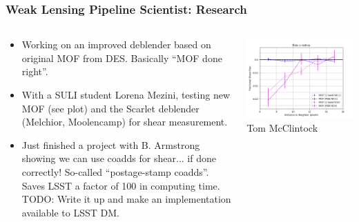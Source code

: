 \documentclass[aspectratio=169]{beamer}
\begin{document}
\frame
{

    \frametitle{Weak Lensing Pipeline Scientist: Research}


    \begin{columns}
        \begin{column}{0.5\textwidth}

            \begin{itemize}

                \item Working on an improved deblender based on original
                    MOF from DES.  Basically ``MOF done right''.

                \item With a SULI student Lorena Mezini, testing new MOF
                    (see plot) and the Scarlet deblender (Melchior, Moolencamp)
                    for shear measurement.

                \item Just finished a project with B. Armstrong showing we can use coadds
                    for shear... if done correctly!  So-called ``postage-stamp
                    coadds''.  Saves LSST a factor of 100 in computing
                    time. TODO: Write it up and make an implementation
                    available to LSST DM.

            \end{itemize}
        \end{column}
        \begin{column}{0.5\textwidth}
            \begin{center}
                \includegraphics[width=\textwidth]{bias-v-rad-MOF-multiband.png}
                \newline
                {\tiny Tom McClintock}
            \end{center}
        \end{column}

    \end{columns}

}
\end{document}
